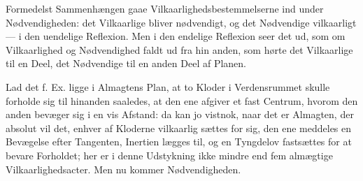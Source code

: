 \documentclass[12pt,a4paper]{book}
\begin{document}
Formedelst Sammenhængen gaae Vilkaarlighedsbestemmelserne ind under
Nødvendigheden: det Vilkaarlige bliver nødvendigt, og det Nødvendige
vilkaarligt --- i den uendelige Reflexion. Men i den endelige Reflexion
seer det ud, som om Vilkaarlighed og Nødvendighed faldt ud fra hin\-%
anden, som hørte det Vilkaarlige til en Deel, det Nødvendige til en
anden Deel af Planen.

Lad det f. Ex. ligge i Almagtens Plan, at to Kloder i Verdensrummet
skulle forholde sig til hinanden saaledes, at den ene afgiver et fast
Centrum, hvorom den anden bevæger sig i en vis Afstand: da kan jo
vistnok, naar det er Almagten, der absolut vil det, enhver af Kloderne
vilkaarlig sættes for sig, den ene meddeles en Bevægelse efter
Tangenten, Inertien lægges til, og en Tyngdelov fastsættes for at
bevare Forholdet; her er i denne Udstykning ikke mindre end fem
almægtige Vilkaarlighedsacter. Men nu kommer Nødvendigheden.
\end{document}
